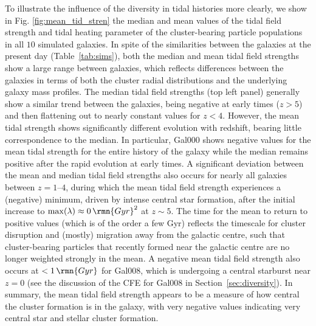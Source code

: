 \documentclass[fleqn,usenatbib]{mnras}
\newcommand\Gyr{\,\rmn{Gyr}}
\newcommand{\numgal}{10}
\begin{document}
To illustrate the influence of the diversity in tidal histories more clearly, we show in Fig. \ref{fig:mean_tid_stren} the median and mean values of the tidal field strength and tidal heating parameter of the cluster-bearing particle populations in all $\numgal$ simulated galaxies. 
In spite of the similarities between the galaxies at the present day (Table~\ref{tab:sims}), both the median and mean tidal field strengths show a large range between galaxies, which reflects differences between the galaxies in terms of both the cluster radial distributions and the underlying galaxy mass profiles. 
The median tidal field strengths (top left panel) generally show a similar trend between the galaxies, being negative at early times ($z>5$) and then flattening out to nearly constant values for $z<4$.
However, the mean tidal strength shows significantly different evolution with redshift, bearing little correspondence to the median. In particular, Gal000 shows negative values for the mean tidal strength for the entire history of the galaxy while the median remains positive after the rapid evolution at early times. 
A significant deviation between the mean and median tidal field strengths also occurs for nearly all galaxies between $z=1$--$4$, during which the mean tidal field strength experiences a (negative) minimum, driven by intense central star formation, after the initial increase to $\max(\lambda)\approx0 \Gyr^2$ at $z\sim5$.
The time for the mean to return to positive values (which is of the order a few Gyr) reflects the timescale for cluster disruption and (mostly) migration away from the galactic centre, such that cluster-bearing particles that recently formed near the galactic centre are no longer weighted strongly in the mean.
A negative mean tidal field strength also occurs at $<1 \Gyr$ for Gal008, which is undergoing a central starburst near $z=0$ (see the discussion of the CFE for Gal008 in Section~\ref{sec:diversity}).
In summary, the mean tidal field strength appears to be a measure of how central the cluster formation is in the galaxy, with very negative values indicating very central star and stellar cluster formation. 
\end{document}
